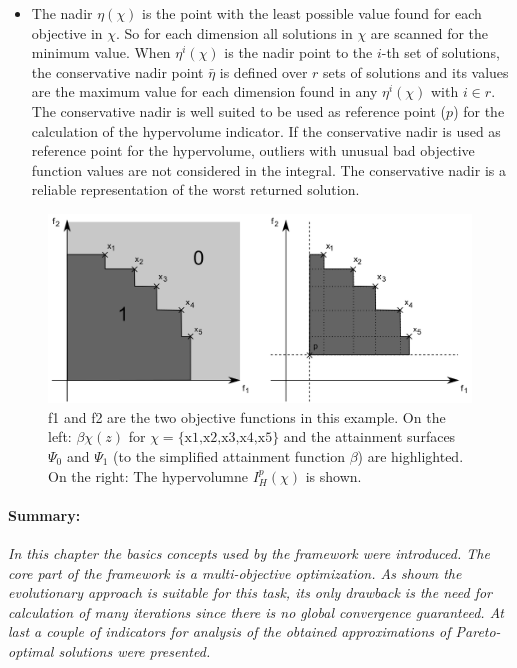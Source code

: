 \documentclass[12pt,twoside]{article}
\theoremstyle{plain}
\theoremstyle{definition}
\theoremstyle{remark}
\begin{document}
\begin{itemize}
	\item The nadir $\eta(\chi)$ is the point with the least possible value found for each objective in $\chi$. So for each dimension all solutions in $\chi$ are scanned for the minimum value.
	When $\eta^i(\chi)$ is the nadir point to the $i$-th set of solutions, the conservative nadir point $\bar{\eta}$ is defined over $r$ sets of solutions and its values are the maximum value for each dimension found in any $\eta^i(\chi)$ with $i\in r$. The conservative nadir is well suited to be used as reference point ($p$) for the calculation of the hypervolume indicator. If the conservative nadir is used as reference point for the hypervolume, outliers with unusual bad objective function values are not considered in the integral. The conservative nadir is a reliable representation of the \glqq worst\grqq{} returned solution.
\end{itemize}
 \addtocounter{footnote}{-1}
\begin{figure}[h]
	\begin{center}
		\includegraphics[width=1\textwidth]{Bilder/attainment.png}
	\end{center}
	\caption[f1 and f2 are the two objective functions in this example. On the left: $\beta\chi(z)$ for $\chi = \text{\{x1,x2,x3,x4,x5\}}$ and the attainment surfaces $\Psi_0$ and $\Psi_1$ (to the simplified attainment function $\beta$) are highlighted. On the right: The hypervolumne $I^p_H(\chi)$ is shown.]{f1 and f2 are the two objective functions in this example. On the left: $\beta\chi(z)$ for $\chi = \text{\{x1,x2,x3,x4,x5\}}$ and the attainment surfaces $\Psi_0$ and $\Psi_1$ (to the simplified attainment function $\beta$) are highlighted. On the right: The hypervolumne $I^p_H(\chi)$ is shown. \footnotemark}
	\label{fig:attainment}
\end{figure}
\paragraph{Summary:}
\textit{
	In this chapter the basics concepts used by the framework were introduced.
	The core part of the framework is a multi-objective optimization. 
	As shown the evolutionary approach is suitable for this task, its only drawback is the need for calculation of many iterations since there is no global convergence guaranteed.
	At last a couple of indicators for analysis of the obtained approximations of Pareto-optimal solutions were presented.
}
\end{document}
